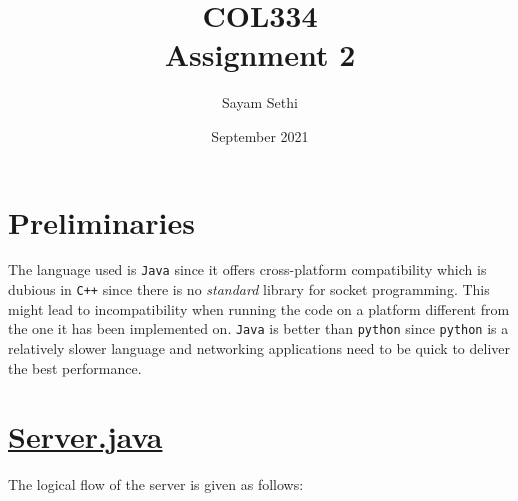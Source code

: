\documentclass[11pt]{article}
\title{COL334\\Assignment 2}
\author{Sayam Sethi}
\date{September 2021}
\begin{document}
\maketitle

\tableofcontents

\section{Preliminaries}
The language used is \texttt{Java} since it offers cross-platform compatibility which is dubious in \texttt{C++} since there is no \textit{standard} library for socket programming. This might lead to incompatibility when running the code on a platform different from the one it has been implemented on. \texttt{Java} is better than \texttt{python} since \texttt{python} is a relatively slower language and networking applications need to be quick to deliver the best performance.

\section{\href{run:./Server.java}{Server.java}}
The logical flow of the server is given as follows:
\begin{center}
\end{center}
\end{document}
